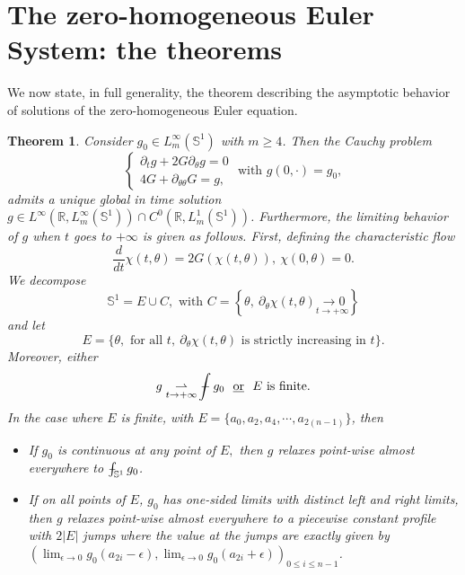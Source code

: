 \documentclass[10pt]{article}
\numberwithin{equation}{section}
\theoremstyle{plain}
\newtheorem{theorem}{Theorem}
\theoremstyle{definition}
\newtheorem{remark}[lemma]{Remark}
\newcommand{\prt}[1]{\left( #1 \right)}
\newcommand{\abs}[1]{\left| #1 \right|}
\def\Xint#1{\mathchoice
{\XXint\displaystyle\textstyle{#1}}%
{\XXint\textstyle\scriptstyle{#1}}%
{\XXint\scriptstyle\scriptscriptstyle{#1}}%
{\XXint\scriptscriptstyle\scriptscriptstyle{#1}}%
\!\int}
\def\XXint#1#2#3{{\setbox0=\hbox{$#1{#2#3}{\int}$ }
\vcenter{\hbox{$#2#3$ }}\kern-.6\wd0}}
\def\dashint{\Xint-}
\numberwithin{equation}{section}
\begin{document}





\section{The zero-homogeneous Euler System: the theorems}

We now state, in full generality, the theorem describing the asymptotic behavior of solutions of the zero-homogeneous Euler equation.

\begin{theorem}\label{0-hom Euler Cauchy thm}
Consider $g_0\in L^\infty_m(\mathbb{S}^1)$ with $m\geq 4$. Then the Cauchy problem
\begin{equation}\label{0 homogeneous limit system with initial data}
\begin{cases}
\partial_t g+2G\partial_{\theta}g=0\\
4G+\partial_{\theta \theta}G=g,
\end{cases}
\text{ with } g(0,\cdot)=g_0,
\end{equation}
admits a unique global in time solution $g\in L^\infty(\mathbb{R}, L^\infty_m(\mathbb{S}^1))\cap C^0(\mathbb{R}, L_m^1(\mathbb{S}^1))$. Furthermore, the limiting behavior of $g$ when $t$ goes to $+\infty$ is given as follows. First, defining the characteristic flow 
\[
\frac{d}{dt}\chi(t,\theta)=2G\prt{\chi(t,\theta)}, \ \chi(0,\theta)=0.
\]
We decompose
\[
\mathbb{S}^1=E\cup C, \text{ with } C=\left\{\theta,\ \partial_\theta\chi(t,\theta)\underset{t\rightarrow+\infty}{\longrightarrow0}\right\}
\]
and let
\[
E=\{\theta, \text{ for all }t,\ \partial_\theta\chi(t,\theta) \text{ is strictly increasing in } t\}.
\]
Moreover, either
\[
g \underset{t\rightarrow+\infty}{\rightharpoonup} \dashint g_0  \ \text{ \underline{or} } \ E \text{ is finite}.
\]
In the case where $E$ is finite, with $E=\{a_{0},a_2,a_4,\cdots,a_{2(n-1)}\}$, then 
\begin{itemize}
    \item If $g_0$ is continuous at any point of $E,$ then $g$ relaxes point-wise almost everywhere to $\dashint_{\mathbb{S}^1} g_0$.
    \item If on all points of $E$, $g_0$ has one-sided limits with distinct left and right limits, then $g$ relaxes point-wise almost everywhere to a piecewise constant profile with $2\abs{E}$ jumps where the value at the jumps are exactly given by $\displaystyle \prt{\lim_{\epsilon \rightarrow 0}g_0({a_{2i}-\epsilon}),\lim_{\epsilon \rightarrow 0}g_0(a_{2i}+\epsilon)}_{0\leq i\leq n-1}$. 
\end{itemize}

\end{theorem}
\end{document}
